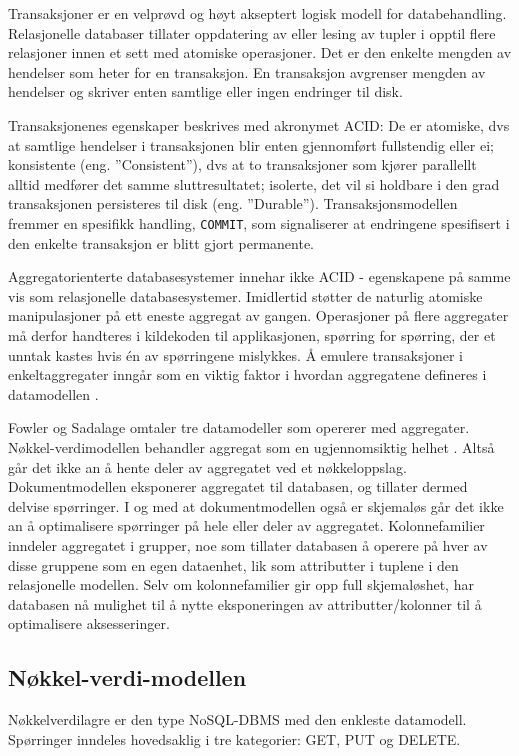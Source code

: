 Transaksjoner er en velprøvd og høyt akseptert logisk modell for databehandling. Relasjonelle databaser tillater oppdatering av eller lesing av tupler i opptil flere relasjoner innen et sett med atomiske operasjoner. Det er den enkelte mengden av hendelser som heter for en transaksjon. En transaksjon avgrenser mengden av hendelser og skriver enten samtlige eller ingen endringer til disk.

Transaksjonenes egenskaper beskrives med akronymet ACID: De er atomiske, dvs at samtlige hendelser i transaksjonen blir enten gjennomført fullstendig eller ei; konsistente (eng. ''Consistent''), dvs at to transaksjoner som kjører parallellt alltid medfører det samme sluttresultatet; isolerte, det vil si holdbare i den grad transaksjonen persisteres til disk (eng. ''Durable''). Transaksjonsmodellen fremmer en spesifikk handling, \texttt{COMMIT}, som signaliserer at endringene spesifisert i den enkelte transaksjon er blitt gjort permanente.

Aggregatorienterte databasesystemer innehar ikke ACID - egenskapene på samme vis som relasjonelle databasesystemer. Imidlertid støtter de naturlig atomiske manipulasjoner på ett eneste aggregat av gangen. Operasjoner på flere aggregater må derfor handteres i kildekoden til applikasjonen, spørring for spørring, der et unntak kastes hvis én av spørringene mislykkes. Å emulere transaksjoner i enkeltaggregater inngår som en viktig faktor i hvordan aggregatene defineres i datamodellen \citep{sadalage2013}.

Fowler og Sadalage omtaler tre datamodeller som opererer med aggregater. Nøkkel-verdimodellen behandler aggregat som en ugjennomsiktig helhet \citep{sadalage2013}. Altså går det ikke an å hente deler av aggregatet ved et nøkkeloppslag. Dokumentmodellen eksponerer aggregatet til databasen, og tillater dermed delvise spørringer. I og med at dokumentmodellen også er skjemaløs går det ikke an å optimalisere spørringer på hele eller deler av aggregatet. Kolonnefamilier inndeler aggregatet i grupper, noe som tillater databasen å operere på hver av disse gruppene som en egen dataenhet, lik som attributter i tuplene i den relasjonelle modellen. Selv om kolonnefamilier gir opp full skjemaløshet, har databasen nå mulighet til å nytte eksponeringen av attributter/kolonner til å optimalisere aksesseringer.

\subsection{Nøkkel-verdi-modellen}

Nøkkelverdilagre er den type NoSQL-DBMS med den enkleste datamodell. Spørringer inndeles hovedsaklig i tre kategorier: GET, PUT og DELETE.
